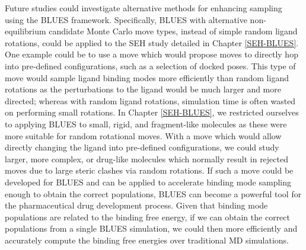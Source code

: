 Future studies could investigate alternative methods for enhancing sampling using the BLUES framework.
Specifically, BLUES with alternative non-equilibrium candidate Monte Carlo move types, instead of simple random ligand rotations, could be applied to the SEH study detailed in Chapter \ref{SEH-BLUES}.
One example could be to use a move which would propose moves to directly hop into pre-defined configurations, such as a selection of docked poses.
This type of move would sample ligand binding modes more efficiently than random ligand rotations as the perturbations to the ligand would be much larger and more directed; whereas with random ligand rotations, simulation time is often wasted on performing small rotations.
In Chapter \ref{SEH-BLUES}, we restricted ourselves to applying BLUES to small, rigid, and fragment-like molecules as these were more suitable for random rotational moves.
With a move which would allow directly changing the ligand into pre-defined configurations, we could study larger, more complex, or drug-like molecules which normally result in rejected moves due to large steric clashes via random rotations.
If such a move could be developed for BLUES and can be applied to accelerate binding mode sampling enough to obtain the correct populations, BLUES can become a powerful tool for the pharmaceutical drug development process.
Given that binding mode populations are related to the binding free energy, if we can obtain the correct populations from a single BLUES simulation, we could then more efficiently and accurately compute the binding free energies over traditional MD simulations.




